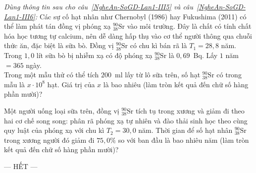 	\begin{ex}%
		\label{NgheAn-SoGD-Lan1-III5}\textit{Dùng thông tin sau cho câu~\ref{NgheAn-SoGD-Lan1-III5} và câu~\ref{NgheAn-SoGD-Lan1-III6}:} Các sự cố hạt nhân như Chernobyl (1986) hay Fukushima (2011) có thể làm phát tán đồng vị phóng xạ ${}^{90}_{38}\text{Sr}$ vào môi trường. Đây là chất có tính chất hóa học tương tự calcium, nên dễ dàng hấp thụ vào cơ thể người thông qua chuỗi thức ăn, đặc biệt là sữa bò. Đồng vị ${}^{90}_{38}\text{Sr}$ có chu kì bán rã là $T_1=28{,}8$ năm. Trong $1{,}0$ lít sữa bò bị nhiễm xạ có độ phóng xạ ${}^{90}_{38}\text{Sr}$ là $0{,}69$~Bq. Lấy $1$ năm $=365$ ngày.\\
		Trong một mẫu thử có thể tích $200$~ml lấy từ lô sữa trên, số hạt ${}^{90}_{38}\text{Sr}$ có trong mẫu là $x\cdot 10^8$ hạt. Giá trị của $x$ là bao nhiêu (làm tròn kết quả đến chữ số hàng phần mười)?
		\par
	\end{ex}

	\begin{ex}%
		\label{NgheAn-SoGD-Lan1-III6}Một người uống loại sữa trên, đồng vị ${}^{90}_{38}\text{Sr}$ tích tụ trong xương và giảm đi theo hai cơ chế song song: phân rã phóng xạ tự nhiên và đào thải sinh học theo cùng quy luật của phóng xạ với chu kì $T_2=30{,}0$ năm. Thời gian để số hạt nhân ${}^{90}_{38}\text{Sr}$ trong xương người đó giảm đi $75{,}0\%$ so với ban đầu là bao nhiêu năm (làm tròn kết quả đến chữ số hàng phần mười)?
		\par
	\end{ex}

	\centerline{--- HẾT ---}


